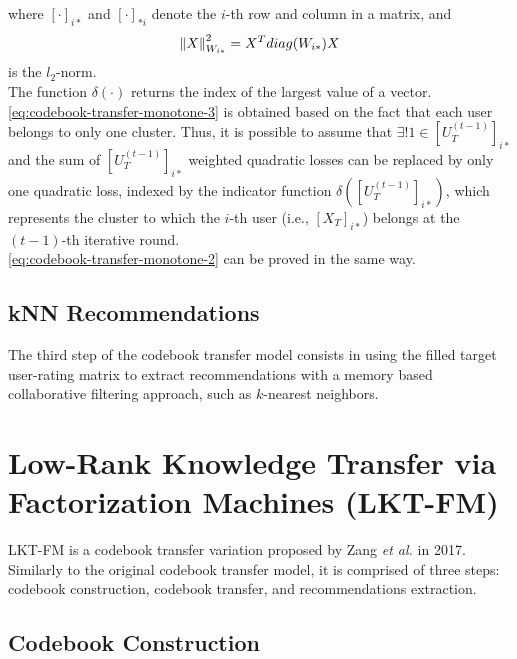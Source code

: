 where $[\cdot]_{i*}$ and $[\cdot]_{*i}$ denote the $i$-th row and column in a matrix, and
\begin{equation*}
\left\lVert X\right\rVert_{W_{i*}}^2 = X^T diag(W_{i*}) X
\end{equation*}
is the $l_2$-norm.\\
The function $\delta(\cdot)$ returns the index of the largest value of a vector.\\
\autoref{eq:codebook-transfer-monotone-3} is obtained based on the fact that each user belongs to only one cluster. Thus, it is possible to assume that $\exists! 1 \in [U_T^{(t - 1)}]_{i*}$ and the sum of $[U_T^{(t - 1)}]_{i*}$ weighted quadratic losses can be replaced by only one quadratic loss, indexed by the indicator function $\delta([U_T^{(t - 1)}]_{i*})$, which represents the cluster to which the $i$-th user (i.e., $[X_T]_{i*}$) belongs at the $(t-1)$-th iterative round.\\
\autoref{eq:codebook-transfer-monotone-2} can be proved in the same way.


\subsection{kNN Recommendations}

The third step of the codebook transfer model consists in using the filled target user-rating matrix to extract recommendations with a memory based collaborative filtering approach, such as $k$-nearest neighbors.


\section{Low-Rank Knowledge Transfer via Factorization Machines (LKT-FM)}

LKT-FM is a codebook transfer variation proposed by Zang \textit{et al.} \cite{10.1007/978-3-319-71246-8_39} in 2017.\\
Similarly to the original codebook transfer model, it is comprised of three steps: codebook construction, codebook transfer, and recommendations extraction.


\subsection{Codebook Construction}

